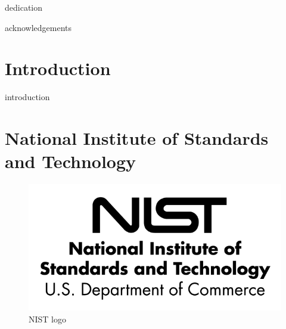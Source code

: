 \documentclass{tnreport}
\begin{document}

\maketitle


\makesecondtitle

{dedication}

{acknowledgements}


\renewcommand{\baselinestretch}{0.5}\normalsize
\tableofcontents
\renewcommand{\baselinestretch}{1.0}\normalsize
\cleardoublepage

\setcounter{page}{1}

\chapter*{Introduction}

    {introduction}

\cleardoublepage

\chapter{National Institute of Standards and Technology}

    \begin{figure}[h]
      \centering
      \includegraphics[scale=0.35]{figures/nist-logo}
      \caption{NIST logo}
      \label{fig:nist-logo}
    \end{figure}
    
\end{document}
